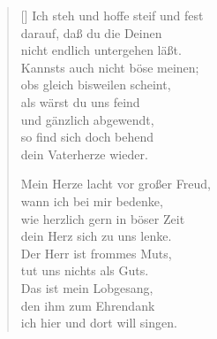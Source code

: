 \begin{multicols}{2}
\begin{verse}[\versewidth]
 Ich steh und hoffe steif und fest\\
darauf, daß du die Deinen\\
nicht endlich untergehen läßt.\\
Kannsts auch nicht böse meinen;\\
obs gleich bisweilen scheint,\\
als wärst du uns feind\\
und gänzlich abgewendt,\\
so find sich doch behend\\
dein Vaterherze wieder.

 Mein Herze lacht vor großer Freud,\\
wann ich bei mir bedenke,\\
wie herzlich gern in böser Zeit\\
dein Herz sich zu uns lenke.\\
Der Herr ist frommes Muts,\\
tut uns nichts als Guts.\\
Das ist mein Lobgesang,\\
den ihm zum Ehrendank\\
ich hier und dort will singen.

\end{verse}
\end{multicols}
